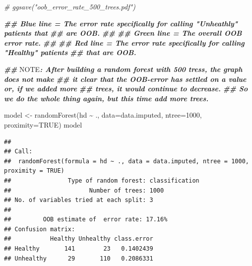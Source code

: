 \documentclass[
]{book}
\newenvironment{Shaded}{\begin{snugshade}}{\end{snugshade}}
\newcommand{\AlertTok}[1]{\textcolor[rgb]{0.94,0.16,0.16}{#1}}
\newcommand{\AttributeTok}[1]{\textcolor[rgb]{0.77,0.63,0.00}{#1}}
\newcommand{\CommentTok}[1]{\textcolor[rgb]{0.56,0.35,0.01}{\textit{#1}}}
\newcommand{\ConstantTok}[1]{\textcolor[rgb]{0.00,0.00,0.00}{#1}}
\newcommand{\DecValTok}[1]{\textcolor[rgb]{0.00,0.00,0.81}{#1}}
\newcommand{\DocumentationTok}[1]{\textcolor[rgb]{0.56,0.35,0.01}{\textbf{\textit{#1}}}}
\newcommand{\FunctionTok}[1]{\textcolor[rgb]{0.00,0.00,0.00}{#1}}
\newcommand{\NormalTok}[1]{#1}
\newcommand{\OtherTok}[1]{\textcolor[rgb]{0.56,0.35,0.01}{#1}}
\newcommand{\SpecialCharTok}[1]{\textcolor[rgb]{0.00,0.00,0.00}{#1}}
\begin{document}
\begin{Shaded}
\begin{Highlighting}[]
\CommentTok{\# ggsave("oob\_error\_rate\_500\_trees.pdf")}

\DocumentationTok{\#\# Blue line = The error rate specifically for calling "Unheathly" patients that}
\DocumentationTok{\#\# are OOB.}
\DocumentationTok{\#\#}
\DocumentationTok{\#\# Green line = The overall OOB error rate.}
\DocumentationTok{\#\#}
\DocumentationTok{\#\# Red line = The error rate specifically for calling "Healthy" patients }
\DocumentationTok{\#\# that are OOB.}

\DocumentationTok{\#\# }\AlertTok{NOTE}\DocumentationTok{: After building a random forest with 500 tress, the graph does not make }
\DocumentationTok{\#\# it clear that the OOB{-}error has settled on a value or, if we added more }
\DocumentationTok{\#\# trees, it would continue to decrease.}
\DocumentationTok{\#\# So we do the whole thing again, but this time add more trees.}

\NormalTok{model }\OtherTok{\textless{}{-}} \FunctionTok{randomForest}\NormalTok{(hd }\SpecialCharTok{\textasciitilde{}}\NormalTok{ ., }\AttributeTok{data=}\NormalTok{data.imputed, }\AttributeTok{ntree=}\DecValTok{1000}\NormalTok{, }\AttributeTok{proximity=}\ConstantTok{TRUE}\NormalTok{)}
\NormalTok{model}
\end{Highlighting}
\end{Shaded}

\begin{verbatim}
## 
## Call:
##  randomForest(formula = hd ~ ., data = data.imputed, ntree = 1000,      proximity = TRUE) 
##                Type of random forest: classification
##                      Number of trees: 1000
## No. of variables tried at each split: 3
## 
##         OOB estimate of  error rate: 17.16%
## Confusion matrix:
##           Healthy Unhealthy class.error
## Healthy       141        23   0.1402439
## Unhealthy      29       110   0.2086331
\end{verbatim}
\end{document}
